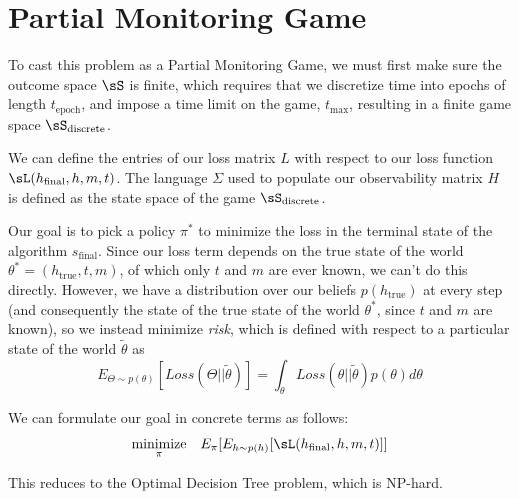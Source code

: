 \section{Partial Monitoring Game}
\label{sec:partial}

To cast this problem as a Partial Monitoring Game, we must first make sure the outcome space $\sS$ is finite, which requires that we discretize time into epochs of length $t_{\text{epoch}}$, and impose a time limit on the game, $t_{\text{max}}$, resulting in a finite game space $\sS_{\text{discrete}}$.


We can define the entries of our loss matrix $L$ with respect to our loss function $\sL(h_{\text{final}}, h, m, t)$.
 The language $\Sigma$ used to populate our observability matrix $H$ is defined as the state space of the game $\sS_{\text{discrete}}$.


Our goal is to pick a policy $\pi^*$ to minimize the loss in the terminal state of the algorithm $s_{\text{final}}$.
 Since our loss term depends on the true state of the world $\theta^* = (h_{\text{true}}, t, m)$, of which only $t$ and $m$ are ever known, we can't do this directly.
 However, we have a distribution over our beliefs $p(h_{\text{true}})$ at every step (and consequently the state of the true state of the world $\theta^*$, since $t$ and $m$ are known), so we instead minimize \textit{risk}, which is defined with respect to a particular state of the world $\tilde{\theta}$ as
\[E_{\Theta \sim p(\theta)}[Loss(\Theta || \tilde{\theta})] = \int_{\theta} Loss(\theta || \tilde{\theta})p(\theta)d\theta\]

We can formulate our goal in concrete terms as follows:
\begin{equation*}
\begin{aligned}
& \underset{\pi}{\text{minimize}}
& & E_{\pi}[E_{h \sim p(h)}[\sL(h_{\text{final}}, h, m, t)]] \\
\end{aligned}
\end{equation*}

This reduces to the Optimal Decision Tree problem, which is NP-hard.

